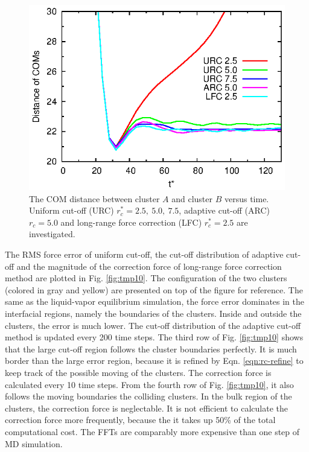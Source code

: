 \documentclass[aps,pre,preprint]{revtex4}
\begin{document}
\begin{figure}
  \centering
  \includegraphics[]{fig/dists.eps}
  \caption{The COM distance between cluster $A$ and cluster $B$ versus
    time. Uniform cut-off (URC) $r_c^\ast = 2.5,\ 5.0,\ 7.5$, adaptive
    cut-off (ARC) $r_c = 5.0$ and long-range force correction (LFC)
    $r^\ast_c = 2.5$ are investigated.  }
  \label{fig:tmp9}
\end{figure}


The RMS force error of uniform cut-off, the cut-off
distribution of adaptive cut-off and the magnitude of
the correction force of long-range force correction method
are plotted in Fig. \ref{fig:tmp10}.  The configuration of the two
clusters (colored in gray and yellow) are presented on top of the
figure for reference. The same as the liquid-vapor equilibrium
simulation, the force error dominates in the interfacial regions,
namely the boundaries of the clusters. Inside and outside the
clusters, the error is much lower. The cut-off distribution of the
adaptive cut-off method is updated every 200 time steps. The third row
of Fig. \ref{fig:tmp10} shows that the large cut-off region follows the cluster
boundaries perfectly. It is much border than the
large error region, because it is refined by Eqn. \eqref{eqn:rc-refine}
to keep track of the
possible moving of the clusters.  The correction force is calculated
every 10 time steps. From the fourth row 
of Fig. \ref{fig:tmp10}, it also follows the moving boundaries the colliding
clusters. In the bulk region of the clusters, the correction force is
neglectable. It is not efficient to calculate the correction force more
frequently, because the it takes up 50\% of the
total computational cost. 
The FFTs are comparably more expensive than one step of MD simulation. 
\end{document}
